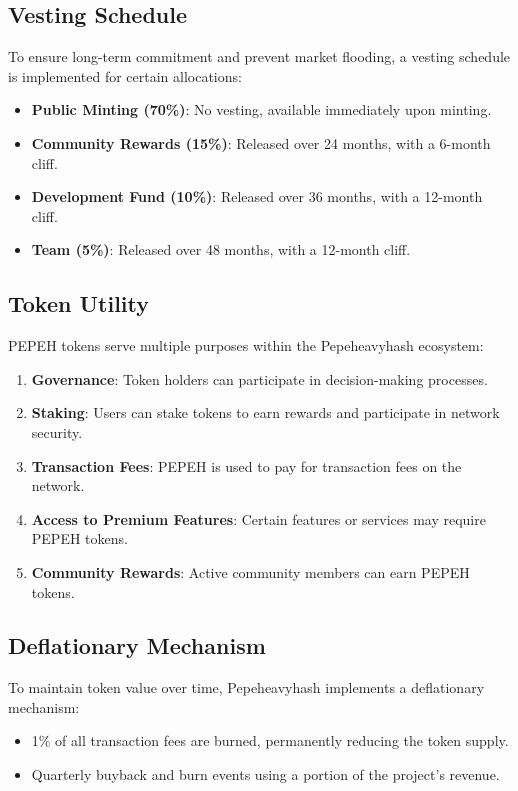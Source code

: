 \documentclass{article}
\begin{document}
\subsection{Vesting Schedule}

To ensure long-term commitment and prevent market flooding, a vesting schedule is implemented for certain allocations:

\begin{itemize}
    \item \textbf{Public Minting (70\%)}: No vesting, available immediately upon minting.
    \item \textbf{Community Rewards (15\%)}: Released over 24 months, with a 6-month cliff.
    \item \textbf{Development Fund (10\%)}: Released over 36 months, with a 12-month cliff.
    \item \textbf{Team (5\%)}: Released over 48 months, with a 12-month cliff.
\end{itemize}

\subsection{Token Utility}

PEPEH tokens serve multiple purposes within the Pepeheavyhash ecosystem:

\begin{enumerate}
    \item \textbf{Governance}: Token holders can participate in decision-making processes.
    \item \textbf{Staking}: Users can stake tokens to earn rewards and participate in network security.
    \item \textbf{Transaction Fees}: PEPEH is used to pay for transaction fees on the network.
    \item \textbf{Access to Premium Features}: Certain features or services may require PEPEH tokens.
    \item \textbf{Community Rewards}: Active community members can earn PEPEH tokens.
\end{enumerate}

\subsection{Deflationary Mechanism}

To maintain token value over time, Pepeheavyhash implements a deflationary mechanism:

\begin{itemize}
    \item 1\% of all transaction fees are burned, permanently reducing the token supply.
    \item Quarterly buyback and burn events using a portion of the project's revenue.
\end{itemize}
\end{document}
